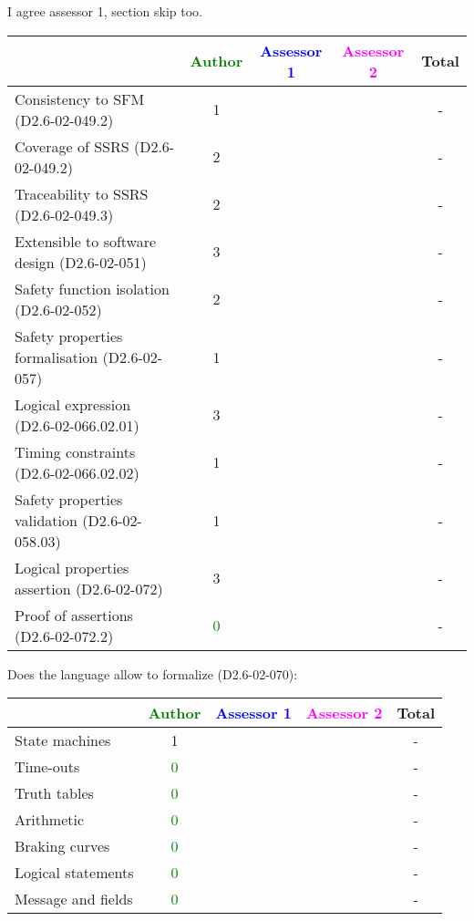 \begin{assessor2}
I agree assessor 1, section skip too.
\end{assessor2}

\begin{tabular}{|l | c | c | c | c|}
\hline
& \textcolor{green}{Author} & \textcolor{blue}{Assessor 1} & \textcolor{magenta}{Assessor 2} & Total \\
\hline
Consistency to SFM (D2.6-02-049.2) & 1    & & & - \\
\hline
Coverage of SSRS (D2.6-02-049.2) & 2    & & & - \\
\hline
Traceability to SSRS (D2.6-02-049.3) & 2    && & - \\
\hline
Extensible to software design (D2.6-02-051) & 3    & & & - \\
\hline
Safety function isolation (D2.6-02-052) & 2    & & & - \\
\hline
Safety properties formalisation (D2.6-02-057) & 1    & & & - \\
\hline
Logical expression (D2.6-02-066.02.01) & 3    & & & - \\
\hline
Timing constraints (D2.6-02-066.02.02) & 1    & & & - \\
\hline
Safety properties validation (D2.6-02-058.03) & 1    & & & - \\
\hline
Logical properties assertion (D2.6-02-072) & 3    & & & - \\
\hline
Proof of assertions (D2.6-02-072.2) & \textcolor{green}{0} & & & - \\
\hline
\end{tabular}

Does the language allow to formalize (D2.6-02-070):

\begin{tabular}{|l | c | c | c | c|}
\hline
& \textcolor{green}{Author} & \textcolor{blue}{Assessor 1} & \textcolor{magenta}{Assessor 2} & Total \\
\hline
State machines & 1    & & & - \\
\hline
Time-outs & \textcolor{green}{0} &  & & - \\
\hline
Truth tables & \textcolor{green}{0} & & & - \\
\hline
Arithmetic & \textcolor{green}{0} & & & - \\
\hline
Braking curves & \textcolor{green}{0} & & & - \\
\hline
Logical statements & \textcolor{green}{0} & & & - \\
\hline
Message and fields & \textcolor{green}{0} & & & - \\
\hline
\end{tabular}

